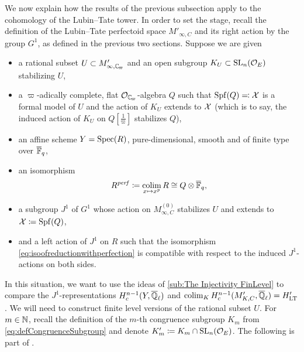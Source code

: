 \documentclass[../main.tex]{subfiles}
\begin{document}
We now explain how the results of the previous subsection apply to the 
cohomology of the Lubin--Tate tower. In order to set the stage, recall the 
definition of the Lubin--Tate perfectoid space $M'_{\infty, C}$ and its
right action by the group $G^1$, as defined in the previous two sections.
Suppose we are given
\begin{itemize}
  \item a rational subset $U\subset M'_{\infty, \Cp}$ and an open
    subgroup $K_U \subset \operatorname{SL}_n(\mathcal{O}_E)$ stabilizing $U$,
  \item a $\varpi$-adically complete, flat $\cO_\Cp$-algebra
    $Q$ such that $\operatorname{Spf}(Q) \eqqcolon \mathcal{X}$ is a formal model of $U$ and the action of 
    $K_U$ extends to $\mathcal{X}$ (which is to say, the induced action of $K_U$ on $Q[\tfrac 1\varpi]$ stabilizes $Q$),
  \item an affine scheme $Y=\operatorname{Spec}(R)$, pure-dimensional, smooth and 
    of finite type over ${\overline {\mathbb{F}}_q}$,
  \item an isomorphism
    \begin{equation}\label{eq:isoofreductionwithperfection}
      R^{\mathit{perf}} \coloneq \operatorname*{colim}_{x \mapsto x^p} R \cong Q \otimes {\overline{\mathbb{F}}_q},
    \end{equation}
  \item a subgroup $J^1$ of $G^1$ whose action on $M_{\infty, C}^{(0)}$ stabilizes
    $U$ and extends to $\mathcal{X} \coloneq \operatorname{Spf}(Q)$, 
  \item and a left action of $J^1$ on $R$ such that the isomorphism
    \eqref{eq:isoofreductionwithperfection} is compatible with respect to the
    induced $J^1$-actions on both sides.
\end{itemize}
In this situation, we want to use
the ideas of \cref{sub:The Injectivity FinLevel} to compare the $J^1$-representations
$H_c^{n-1}(Y, {\overline {\mathbb{Q}}_\ell})$ and $\operatorname*{colim}_K H_c^{n-1}(M'_{K,C}, {\overline {\mathbb{Q}}_\ell}) = H'_{\mathrm{LT}}$. 
We will need to construct finite level versions of the rational subset $U$. 
For $m \in \mathbb{N}$, recall the definition of the $m$-th congruence subgroup $K_m$ from 
\eqref{eq:defCongruenceSubgroup} and denote $K'_m \coloneq K_m \cap \operatorname{SL}_n(\mathcal{O}_E)$. 
The following is part of \cite[Proposition 4.5]{mieda2016geometric}.
\end{document}
